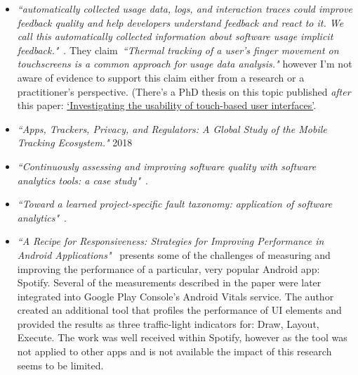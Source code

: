 \begin{itemize}

    \item \emph{``automatically collected usage data, logs, and interaction traces could improve feedback quality and help developers understand feedback and react to it. We call this automatically collected information about software usage implicit feedback."}~. They claim~\emph{``Thermal tracking of a user’s finger movement on touchscreens is a common approach for usage data analysis."} however I'm not aware of evidence to support this claim either from a research or a practitioner's perspective. (There's a PhD thesis on this topic published \emph{after} this paper: \href{http://usir.salford.ac.uk/id/eprint/37784/}{`Investigating the usability of touch-based user interfaces'}.
    
    



    
    \item \emph{``Apps, Trackers, Privacy, and Regulators: A Global Study of the Mobile Tracking Ecosystem."} 2018
    
    \item \emph{``Continuously assessing and improving software quality with software analytics tools: a case study"}~\cite{martinez_fernandez2019_continuously_assessing_and_improving_software_quality_with_software_analytics_tools}.
    
    \item \emph{``Toward a learned project-specific fault taxonomy: application of software analytics"}~\cite{kidwell2015_toward_fault_taxonomy_application_of_software_analytics}.
   

    \item \emph{``A Recipe for Responsiveness: Strategies for Improving Performance in Android Applications"}~\cite{nilsson2016_a_recipe_for_responsiveness_for_improving_android_apps_spotify_masters} presents some of the challenges of measuring and improving the performance of a particular, very popular Android app: Spotify. %
    Several of the measurements described in the paper were later integrated into Google Play Console's Android Vitals service. The author created an additional tool that profiles the performance of UI elements and provided the results as three traffic-light indicators for: Draw, Layout, Execute. The work was well received within Spotify, however as the tool was not applied to other apps and is not available the impact of this research seems to be limited.
    

    
\end{itemize}

